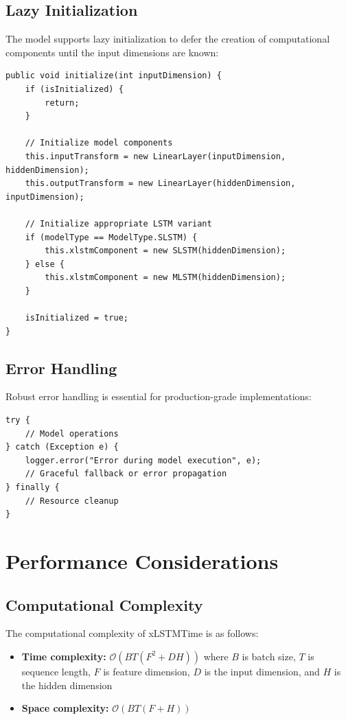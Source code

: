 \documentclass[11pt,a4paper]{article}
\begin{document}
\subsection{Lazy Initialization}

The model supports lazy initialization to defer the creation of computational components until the input dimensions are known:

\begin{lstlisting}[caption=Lazy initialization pattern,label=lst:lazy_init]
public void initialize(int inputDimension) {
    if (isInitialized) {
        return;
    }
    
    // Initialize model components
    this.inputTransform = new LinearLayer(inputDimension, hiddenDimension);
    this.outputTransform = new LinearLayer(hiddenDimension, inputDimension);
    
    // Initialize appropriate LSTM variant
    if (modelType == ModelType.SLSTM) {
        this.xlstmComponent = new SLSTM(hiddenDimension);
    } else {
        this.xlstmComponent = new MLSTM(hiddenDimension);
    }
    
    isInitialized = true;
}
\end{lstlisting}

\subsection{Error Handling}

Robust error handling is essential for production-grade implementations:

\begin{lstlisting}[caption=Error handling strategy,label=lst:error_handling]
try {
    // Model operations
} catch (Exception e) {
    logger.error("Error during model execution", e);
    // Graceful fallback or error propagation
} finally {
    // Resource cleanup
}
\end{lstlisting}

\section{Performance Considerations}

\subsection{Computational Complexity}

The computational complexity of xLSTMTime is as follows:
\begin{itemize}
    \item \textbf{Time complexity:} $\mathcal{O}(BT(F^2 + DH))$ where $B$ is batch size, $T$ is sequence length, $F$ is feature dimension, $D$ is the input dimension, and $H$ is the hidden dimension
    \item \textbf{Space complexity:} $\mathcal{O}(BT(F + H))$
\end{itemize}
\end{document}
